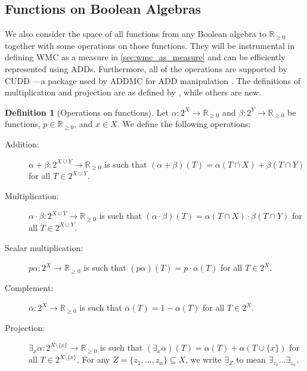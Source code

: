 \documentclass{uai2021} %
\theoremstyle{definition}
\newtheorem{definition}{Definition}
\begin{document}
\subsection{Functions on Boolean Algebras}

We also consider the space of all functions from any Boolean algebra to
$\mathbb{R}_{\ge 0}$ together with some operations on those functions. They will
be instrumental in defining WMC as a measure in \cref{sec:wmc_as_measure} and
can be efficiently represented using ADDs. Furthermore, all of the operations
are supported by CUDD \citep{somenzi1998cudd}---a package used by \textsf{ADDMC}
for ADD manipulation \citep{DBLP:conf/aaai/DudekPV20}. The definitions of
multiplication and projection are as defined by
\citet{DBLP:conf/aaai/DudekPV20}, while others are new.

\begin{definition}[Operations on functions]
  Let $\alpha\colon 2^X \to \mathbb{R}_{\ge 0}$ and $\beta\colon 2^Y \to
  \mathbb{R}_{\ge 0}$ be functions, $p \in \mathbb{R}_{\ge 0}$, and $x \in X$.
  We define the following operations:
  \begin{description}
  \item[Addition:] $\alpha + \beta\colon 2^{X \cup Y} \to \mathbb{R}_{\ge 0}$ is
    such that $(\alpha + \beta)(T) = \alpha(T \cap X) + \beta(T \cap Y)$ for all
    $T \in 2^{X \cup Y}$.
  \item[Multiplication:] $\alpha \cdot \beta\colon 2^{X \cup Y} \to
    \mathbb{R}_{\ge 0}$ is such that $(\alpha \cdot \beta)(T) = \alpha(T \cap X)
    \cdot \beta(T \cap Y)$ for all $T \in 2^{X \cup Y}$.
  \item[Scalar multiplication:] $p\alpha\colon 2^X \to \mathbb{R}_{\ge 0}$ is
    such that $(p\alpha)(T) = p \cdot \alpha(T)$ for all $T \in 2^X$.
  \item[Complement:] $\overline{\alpha}\colon 2^X \to \mathbb{R}_{\ge 0}$ is
    such that $\overline{\alpha}(T) = 1 - \alpha(T)$ for all $T \in 2^X$.
  \item[Projection:] $\exists_x\alpha\colon 2^{X \setminus \{ x \}} \to
    \mathbb{R}_{\ge 0}$ is such that $(\exists_x\alpha)(T) = \alpha(T) +
    \alpha(T \cup \{ x \})$ for all $T \in 2^{X \setminus \{x \}}$. For any $Z =
    \{ z_1, \dots, z_n \} \subseteq X$, we write $\exists_Z$ to mean
    $\exists_{z_1}\dots\exists_{z_n}$.
  \end{description}
\end{definition}
\end{document}
